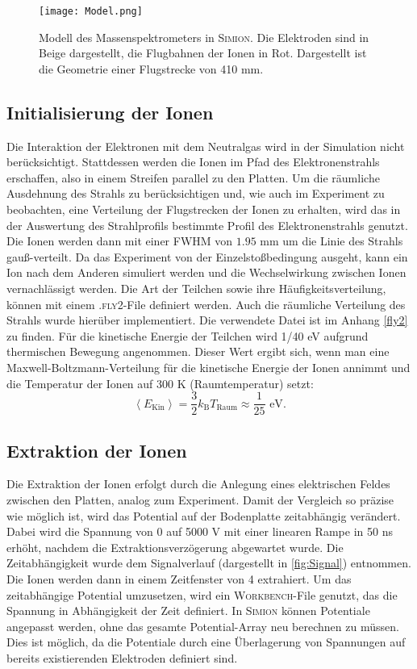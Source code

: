 \begin{figure}
    \centering
    \texttt{[image: Model.png]}
    \caption[Modell des Massenspektrometers in \textsc{Simion}]{Modell des Massenspektrometers in \textsc{Simion}. Die Elektroden sind in Beige dargestellt, die Flugbahnen der Ionen in Rot. Dargestellt ist die Geometrie einer Flugstrecke von 410 mm.}
    \label{fig:model}
\end{figure}



\subsection{Initialisierung der Ionen}
Die Interaktion der Elektronen mit dem Neutralgas wird in der Simulation nicht berücksichtigt. Stattdessen werden die Ionen im Pfad des Elektronenstrahls erschaffen, also in einem Streifen parallel zu den Platten. Um die räumliche Ausdehnung des Strahls zu berücksichtigen und, wie auch im Experiment zu beobachten, eine Verteilung der Flugstrecken der Ionen zu erhalten, wird das in der Auswertung des Strahlprofils bestimmte Profil des Elektronenstrahls genutzt. Die Ionen werden dann mit einer FWHM von $1.95$ mm um die Linie des Strahls gauß-verteilt. Da das Experiment von der Einzelstoßbedingung ausgeht, kann ein Ion nach dem Anderen simuliert werden und die Wechselwirkung zwischen Ionen vernachlässigt werden.
Die Art der Teilchen sowie ihre Häufigkeitsverteilung, können mit einem \textsc{.fly2}-File definiert werden. Auch die räumliche Verteilung des Strahls wurde hierüber implementiert. Die verwendete Datei ist im Anhang \ref{fly2} zu finden. Für die kinetische Energie der Teilchen wird 1/40 eV aufgrund thermischen Bewegung angenommen. Dieser Wert ergibt sich, wenn man eine Maxwell-Boltzmann-Verteilung für die kinetische 
Energie der Ionen annimmt und die Temperatur der Ionen auf 300 K (Raumtemperatur) setzt: 
\begin{equation}
    \label{eq:kin}
    \left< E_{\text{Kin}} \right> = \frac{3}{2} k_\mathrm{B} T_\mathrm{Raum} \approx \frac{1}{25} \text{ eV}.
\end{equation}

\subsection{Extraktion der Ionen}
Die Extraktion der Ionen erfolgt durch die Anlegung eines elektrischen Feldes zwischen den Platten, analog zum Experiment. Damit der Vergleich so präzise wie möglich ist, wird das Potential auf der Bodenplatte zeitabhängig verändert. Dabei wird die Spannung von 0 auf 5000 V mit einer linearen Rampe in 50 ns erhöht, nachdem die Extraktionsverzögerung abgewartet wurde. Die Zeitabhängigkeit wurde dem Signalverlauf (dargestellt in \ref{fig:Signal}) entnommen. Die Ionen werden dann in einem Zeitfenster von 4  extrahiert. Um das zeitabhängige Potential umzusetzen, wird ein \textsc{Workbench}-File genutzt, das die Spannung in Abhängigkeit der Zeit definiert. In \textsc{Simion} können Potentiale angepasst werden, ohne das gesamte Potential-Array neu berechnen zu müssen. Dies ist möglich, da die Potentiale durch eine Überlagerung von Spannungen auf bereits existierenden Elektroden definiert sind.

